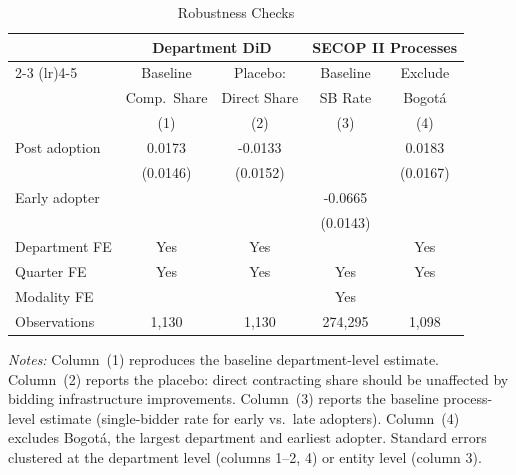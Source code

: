 \begin{table}
\begin{threeparttable}[t]
\centering
\caption{Robustness Checks}
\label{tab:robustness}
\small
\begin{tabular}{lcccc}
\toprule
 & \multicolumn{2}{c}{Department DiD} & \multicolumn{2}{c}{SECOP II Processes} \\
\cmidrule(lr){2-3} \cmidrule(lr){4-5}
 & Baseline & Placebo: & Baseline & Exclude \\
 & Comp.\ Share & Direct Share & SB Rate & Bogot\'{a} \\
 & (1) & (2) & (3) & (4) \\
\midrule
Post adoption & 0.0173 & -0.0133 & & 0.0183 \\
 & (0.0146) & (0.0152) & & (0.0167) \\
Early adopter & & & -0.0665 & \\
 & & & (0.0143) & \\
\midrule
Department FE & Yes & Yes & & Yes \\
Quarter FE & Yes & Yes & Yes & Yes \\
Modality FE & & & Yes & \\
Observations & 1,130 & 1,130 & 274,295 & 1,098 \\
\bottomrule
\end{tabular}
\begin{tablenotes}[flushleft]\small
\item \textit{Notes:} Column~(1) reproduces the baseline department-level estimate. Column~(2) reports the placebo: direct contracting share should be unaffected by bidding infrastructure improvements. Column~(3) reports the baseline process-level estimate (single-bidder rate for early vs.\ late adopters). Column~(4) excludes Bogot\'{a}, the largest department and earliest adopter. Standard errors clustered at the department level (columns 1--2, 4) or entity level (column 3).
\end{tablenotes}
\end{threeparttable}
\end{table}

